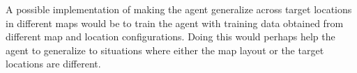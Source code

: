 \documentclass[a4paper,14pt]{article}
\begin{document}
A possible implementation of making the agent generalize across target locations in different maps would be to train the agent with training data obtained from different map and location configurations. Doing this would perhaps help the agent to generalize to situations where either the map layout or the target locations are different. 


\end{document}
